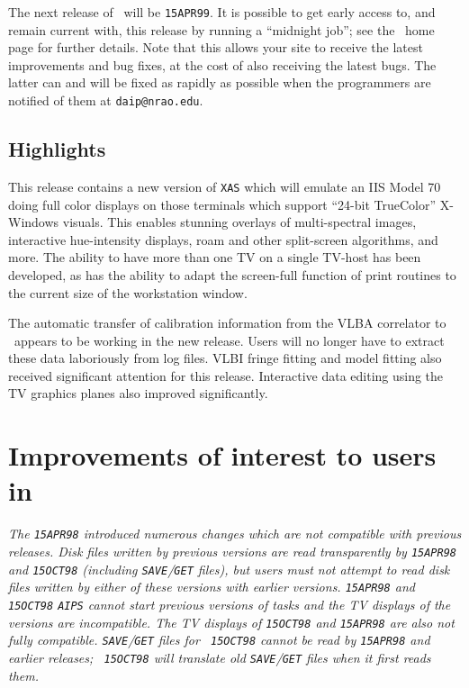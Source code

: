 The next release of \AIPS\ will be \texttt{15APR99}.  It is possible
to get early access to, and remain current with, this release by
running a ``midnight job''; see the \AIPS\ home page for further
details.  Note that this allows your site to receive the latest
improvements and bug fixes, at the cost of also receiving the latest
bugs.  The latter can and will be fixed as rapidly as possible when
the programmers are notified of them at \texttt{daip@nrao.edu}.

\subsection{Highlights}

This release contains a new version of \texttt{XAS} which will emulate
an IIS Model 70 doing full color displays on those terminals which
support ``24-bit TrueColor'' X-Windows visuals.  This enables stunning
overlays of multi-spectral images, interactive hue-intensity displays,
roam and other split-screen algorithms, and more.  The ability to have
more than one TV on a single TV-host has been developed, as has the
ability to adapt the screen-full function of print routines to the
current size of the workstation window.

The automatic transfer of calibration information from the VLBA
correlator to \AIPS\ appears to be working in the new release.  Users
will no longer have to extract these data laboriously from log files.
VLBI fringe fitting and model fitting also received significant
attention for this release.  Interactive data editing using the TV
graphics planes also improved significantly.

\vfill\eject

\section{Improvements of interest to users in \RELEASENAME}

\emph{The {\tt 15APR98} introduced numerous changes which are not
compatible with previous releases.  Disk files written by previous
versions are read transparently by {\tt 15APR98} and {\tt 15OCT98}
(including {\tt SAVE}/{\tt GET} files), but users must not attempt to
read disk files written by either of these versions with earlier
versions.  {\tt 15APR98} and {\tt 15OCT98} {\tt AIPS} cannot start
previous versions of tasks and the TV displays of the versions are
incompatible.  The TV displays of {\tt 15OCT98} and {\tt 15APR98} are
also not fully compatible.  {\tt SAVE}/{\tt GET} files for {\tt
15OCT98} cannot be read by {\tt 15APR98} and earlier releases; {\tt
15OCT98} will translate old {\tt SAVE}/{\tt GET} files when it first
reads them.}

